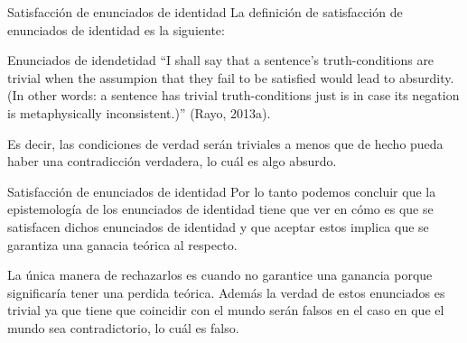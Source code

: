 \documentclass{beamer}
\begin{document}
      \begin{frame}{Satisfacción de enunciados de identidad}
        La definición de satisfacción de enunciados de identidad 
        es la siguiente: 
        \begin{block}{Enunciados de idendetidad} \pause
          \small ``I shall say that a sentence’s 
          truth-conditions are trivial when the assumpion that they 
          fail to be satisfied would lead to absurdity. (In other 
          words: a sentence has trivial truth-conditions just is in 
          case its negation is metaphysically 
          inconsistent.)'' (Rayo, 2013a). \pause
        \end{block}
        Es decir, las condiciones de verdad serán triviales a menos 
        que de hecho pueda haber una contradicción 
        verdadera, lo cuál es algo absurdo.
      \end{frame}
      \begin{frame}{Satisfacción de enunciados de identidad}
        Por lo tanto podemos concluir que la epistemología de los 
        enunciados de identidad tiene que ver en c\'omo 
        es que se satisfacen dichos enunciados de identidad y que 
        aceptar estos implica que se garantiza una ganacia teórica 
        al respecto. 
        
        La \'unica manera de rechazarlos es cuando no 
        garantice una ganancia porque significaría tener una perdida 
        teórica. Además la verdad de estos enunciados es trivial 
        ya que tiene que coincidir con el mundo serán falsos en el
        caso en que el mundo sea contradictorio, lo cuál es falso.
      \end{frame}
\end{document}
